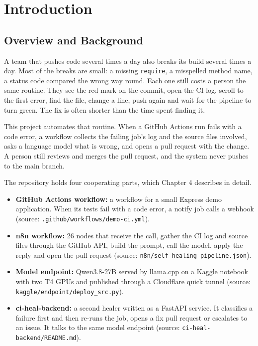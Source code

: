 \chapter{Introduction}

\section{Overview and Background}

A team that pushes code several times a day also breaks its build several times a day. Most of the breaks are small: a missing \texttt{require}, a misspelled method name, a status code compared the wrong way round. Each one still costs a person the same routine. They see the red mark on the commit, open the CI log, scroll to the first error, find the file, change a line, push again and wait for the pipeline to turn green. The fix is often shorter than the time spent finding it.

This project automates that routine. When a GitHub Actions run fails with a code error, a workflow collects the failing job's log and the source files involved, asks a language model what is wrong, and opens a pull request with the change. A person still reviews and merges the pull request, and the system never pushes to the main branch.

The repository holds four cooperating parts, which Chapter 4 describes in detail.

\begin{itemize}
  \item \textbf{GitHub Actions workflow:} a workflow for a small Express demo application. When its tests fail with a code error, a notify job calls a webhook (source: \texttt{.github/\allowbreak{}workflows/\allowbreak{}demo-ci.yml}).
  \item \textbf{n8n workflow:} 26 nodes that receive the call, gather the CI log and source files through the GitHub API, build the prompt, call the model, apply the reply and open the pull request (source: \texttt{n8n/\allowbreak{}self\_\allowbreak{}healing\_\allowbreak{}pipeline.json}).
  \item \textbf{Model endpoint:} Qwen3.8-27B served by llama.cpp on a Kaggle notebook with two T4 GPUs and published through a Cloudflare quick tunnel (source: \texttt{kaggle/\allowbreak{}endpoint/\allowbreak{}deploy\_\allowbreak{}src.py}).
  \item \textbf{ci-heal-backend:} a second healer written as a FastAPI service. It classifies a failure first and then re-runs the job, opens a fix pull request or escalates to an issue. It talks to the same model endpoint (source: \texttt{ci-heal-backend/\allowbreak{}README.md}).
\end{itemize}


